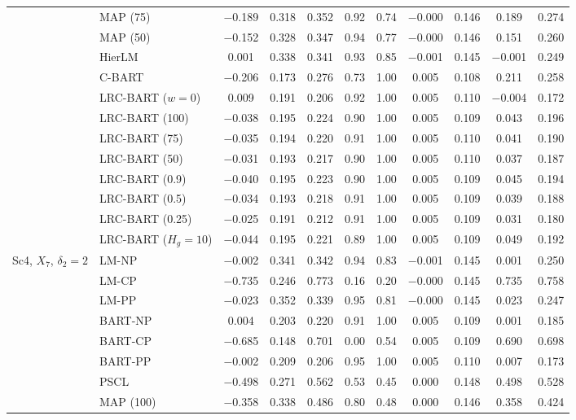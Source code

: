 \begin{center}
\begin{longtable}{llccccccccc}
& MAP (75) & $-$0.189 & 0.318 & 0.352 & 0.92 & 0.74 & $-$0.000 & 0.146 & 0.189 & 0.274 \\
& MAP (50) & $-$0.152 & 0.328 & 0.347 & 0.94 & 0.77 & $-$0.000 & 0.146 & 0.151 & 0.260 \\
& HierLM & 0.001 & 0.338 & 0.341 & 0.93 & 0.85 & $-$0.001 & 0.145 & $-$0.001 & 0.249 \\
& C-BART & $-$0.206 & 0.173 & 0.276 & 0.73 & 1.00 & 0.005 & 0.108 & 0.211 & 0.258 \\
& LRC-BART ($w=0$) & 0.009 & 0.191 & 0.206 & 0.92 & 1.00 & 0.005 & 0.110 & $-$0.004 & 0.172 \\
& LRC-BART (100) & $-$0.038 & 0.195 & 0.224 & 0.90 & 1.00 & 0.005 & 0.109 & 0.043 & 0.196 \\
& LRC-BART (75) & $-$0.035 & 0.194 & 0.220 & 0.91 & 1.00 & 0.005 & 0.110 & 0.041 & 0.190 \\
& LRC-BART (50) & $-$0.031 & 0.193 & 0.217 & 0.90 & 1.00 & 0.005 & 0.110 & 0.037 & 0.187 \\
& LRC-BART (0.9) & $-$0.040 & 0.195 & 0.223 & 0.90 & 1.00 & 0.005 & 0.109 & 0.045 & 0.194 \\
& LRC-BART (0.5) & $-$0.034 & 0.193 & 0.218 & 0.91 & 1.00 & 0.005 & 0.109 & 0.039 & 0.188 \\
& LRC-BART (0.25) & $-$0.025 & 0.191 & 0.212 & 0.91 & 1.00 & 0.005 & 0.109 & 0.031 & 0.180 \\
& LRC-BART ($H_g=10$) & $-$0.044 & 0.195 & 0.221 & 0.89 & 1.00 & 0.005 & 0.109 & 0.049 & 0.192 \\
\midrule
\multirow{20}{*}{Sc4, $X_7$, $\delta_2=2$} & LM-NP & $-$0.002 & 0.341 & 0.342 & 0.94 & 0.83 & $-$0.001 & 0.145 & 0.001 & 0.250 \\
& LM-CP & $-$0.735 & 0.246 & 0.773 & 0.16 & 0.20 & $-$0.000 & 0.145 & 0.735 & 0.758 \\
& LM-PP & $-$0.023 & 0.352 & 0.339 & 0.95 & 0.81 & $-$0.000 & 0.145 & 0.023 & 0.247 \\
& BART-NP & 0.004 & 0.203 & 0.220 & 0.91 & 1.00 & 0.005 & 0.109 & 0.001 & 0.185 \\
& BART-CP & $-$0.685 & 0.148 & 0.701 & 0.00 & 0.54 & 0.005 & 0.109 & 0.690 & 0.698 \\
& BART-PP & $-$0.002 & 0.209 & 0.206 & 0.95 & 1.00 & 0.005 & 0.110 & 0.007 & 0.173 \\
& PSCL & $-$0.498 & 0.271 & 0.562 & 0.53 & 0.45 & 0.000 & 0.148 & 0.498 & 0.528 \\
& MAP (100) & $-$0.358 & 0.338 & 0.486 & 0.80 & 0.48 & 0.000 & 0.146 & 0.358 & 0.424 \\

\end{longtable}
\end{center}
